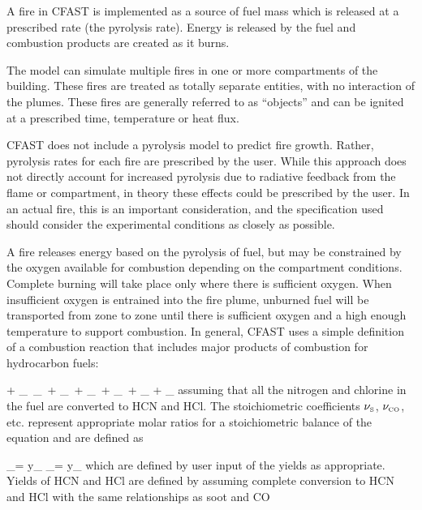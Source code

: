 A fire in CFAST is implemented as a source of fuel mass which is released at a prescribed rate
(the pyrolysis rate). Energy is released by the fuel and combustion products are created as it
burns.

The model can simulate multiple fires in one or more compartments of the building. These fires
are treated as totally separate entities, with no interaction of the plumes. These fires are generally
referred to as ``objects'' and can be ignited at a prescribed time, temperature or heat flux.

CFAST does not include a pyrolysis model to predict fire growth. Rather, pyrolysis rates for
each fire are prescribed by the user. While this approach does not directly account for increased
pyrolysis due to radiative feedback from the flame or compartment, in theory these effects could
be prescribed by the user. In an actual fire, this is an important consideration, and the
specification used should consider the experimental conditions as closely as possible.

A fire releases energy based on the pyrolysis of fuel, but may be constrained by the oxygen
available for combustion depending on the compartment conditions. Complete burning will take
place only where there is sufficient oxygen. When insufficient oxygen is entrained into the fire
plume, unburned fuel will be transported from zone to zone until there is sufficient oxygen and a
high enough temperature to support combustion. In general, CFAST uses a simple definition of
a combustion reaction that includes major products of combustion for hydrocarbon fuels:

\be  {} +  \nu_\OTWO \,   \rightarrow  \nu_\COTWO \,  + \nu_\HTWOO \,  + \nu_\CO \,  +
     \nu_\So \,   + \nu_\HCl {} + \nu_\HCN {} \label{stoich} \ee
assuming that all the nitrogen and chlorine in the fuel are converted to HCN and HCl. The stoichiometric coefficients $\nu_{\tiny \hbox{S}}$, $\nu_{\tiny \hbox{CO}}$, etc. represent appropriate molar ratios for a stoichiometric balance of the equation and are defined as

\be
   \nu_\So =  \; y_\So \label{soot_yield}
\ee
\be
   \nu_\CO =  \; y_\CO \label{CO_yield}
\ee
which are defined by user input of the yields as appropriate.  Yields of HCN and HCl are defined by assuming complete conversion to HCN and HCl with the same relationships as soot and CO

